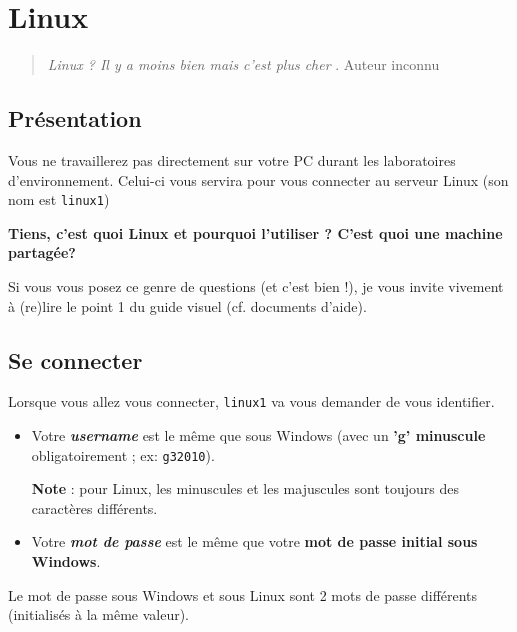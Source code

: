 \documentclass[a4paper,11pt]{article}
\begin{document}
\clearpage
\section{Linux}
\begin{quotation}
\guillemotleft  \textit{Linux ? Il y a moins bien mais c'est plus cher} \guillemotright . Auteur inconnu
\end{quotation}
\subsection{Présentation}
Vous ne travaillerez pas directement sur votre PC durant les laboratoires d'environnement. Celui-ci vous servira pour vous connecter au serveur Linux (son nom est \verb_linux1_)
 \par
 \textbf{Tiens, c'est quoi Linux et pourquoi l'utiliser ? C'est quoi une machine partag\'ee?}
 \par
  Si vous vous posez ce genre de questions (et c'est bien !), je vous invite vivement \`a (re)lire le point 1 du guide visuel (cf. documents d'aide).
 \par
\subsection{Se connecter}
Lorsque vous allez vous connecter, \verb_linux1_ va vous demander de vous identifier.
				
 \par
        
\begin{itemize}
				
\item Votre \textbf{\textit{username}} est le m\^eme que sous Windows (avec un \textbf{'g' minuscule} obligatoirement ; ex:	\verb_g32010_).
\par
\textbf{Note} : pour Linux, les minuscules et les majuscules sont toujours des caract\`eres diff\'erents.
					
\item Votre \textit{\textbf{mot de passe}} est le m\^eme que votre \textbf{mot de passe initial sous Windows}.
					
\end{itemize}
				
Le mot de passe sous Windows et sous Linux sont 2 mots de passe diff\'erents (initialis\'es \`a la m\^eme valeur).
        
\end{document}
